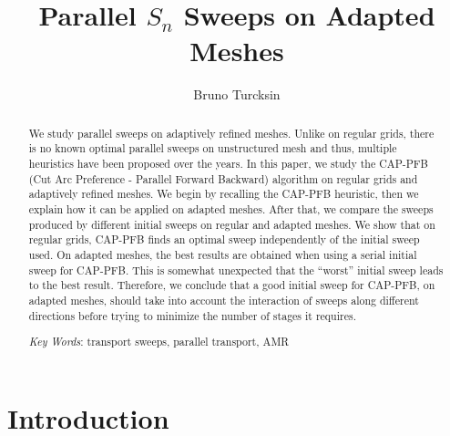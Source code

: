 \documentclass{mc2015}
\renewcommand{\(}{\left(}
\renewcommand{\)}{\right)}
\renewcommand{\[}{\left[}
\renewcommand{\]}{\right]}
\begin{document}
\title{Parallel $S_n$ Sweeps on Adapted Meshes}
\author{Bruno Turcksin} 

\maketitle

\begin{abstract}
  We study parallel sweeps on adaptively refined meshes. Unlike on regular
  grids, there is no known optimal parallel sweeps on unstructured mesh and
  thus, multiple heuristics have been proposed over the years. In this paper, we
  study the CAP-PFB (Cut Arc Preference - Parallel Forward Backward) algorithm
  on regular grids and adaptively refined meshes. We begin by recalling the
  CAP-PFB heuristic, then we explain how it can be applied on adapted meshes.
  After that, we compare the sweeps produced by different initial sweeps on
  regular and adapted meshes. We show that on regular grids, CAP-PFB finds an
  optimal sweep independently of the initial sweep used. On adapted meshes, the
  best results are obtained when using a serial initial sweep for CAP-PFB. This
  is somewhat unexpected that the ``worst'' initial sweep leads to the best
  result. Therefore, we conclude that a good initial sweep for CAP-PFB, on
  adapted meshes, should take into
  account the interaction of sweeps along different directions before trying to
  minimize the number of stages it requires.

  \emph{Key Words}: transport sweeps, parallel transport, AMR
\end{abstract}

\section{Introduction}
\end{document}
